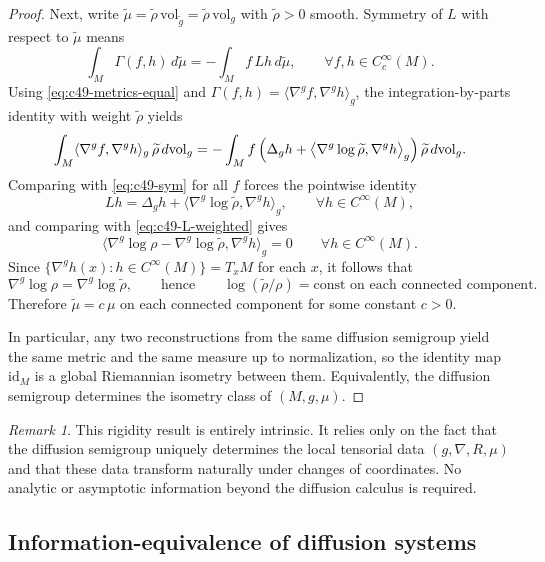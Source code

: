 \documentclass[11pt]{amsart}
\theoremstyle{definition}
\theoremstyle{remark}
\newtheorem{remark}[theorem]{Remark}
\begin{document}
\begin{proof}
Next, write $\widetilde\mu=\widetilde\rho\,\mathrm{vol}_{\widetilde g}
=\widetilde\rho\,\mathrm{vol}_g$ with $\widetilde\rho>0$ smooth. Symmetry of $L$ with respect to
$\widetilde\mu$ means
\begin{equation}\label{eq:c49-sym}
\int_M \Gamma(f,h)\,d\widetilde\mu
=-\int_M f\,Lh\,d\widetilde\mu,
\qquad \forall f,h\in C_c^\infty(M).
\end{equation}
Using \eqref{eq:c49-metrics-equal} and $\Gamma(f,h)=\langle \nabla^g f,\nabla^g h\rangle_g$,
the integration-by-parts identity with weight $\widetilde\rho$ yields
\[
\int_M \langle \nabla^g f,\nabla^g h\rangle_g\,\widetilde\rho\,d\mathrm{vol}_g
=-\int_M f\,\Bigl(\Delta_g h+\bigl\langle \nabla^g\log\widetilde\rho,\nabla^g h\bigr\rangle_g\Bigr)\,
\widetilde\rho\,d\mathrm{vol}_g.
\]
Comparing with \eqref{eq:c49-sym} for all $f$ forces the pointwise identity
\[
Lh=\Delta_g h+\bigl\langle \nabla^g\log\widetilde\rho,\nabla^g h\bigr\rangle_g,
\qquad \forall h\in C^\infty(M),
\]
and comparing with \eqref{eq:c49-L-weighted} gives
\[
\bigl\langle \nabla^g\log\rho-\nabla^g\log\widetilde\rho,\nabla^g h\bigr\rangle_g=0
\qquad \forall h\in C^\infty(M).
\]
Since $\{\nabla^g h(x):h\in C^\infty(M)\}=T_xM$ for each $x$, it follows that
\[
\nabla^g\log\rho=\nabla^g\log\widetilde\rho,
\qquad\text{hence}\qquad
\log(\widetilde\rho/\rho)=\text{const on each connected component}.
\]
Therefore $\widetilde\mu=c\,\mu$ on each connected component for some constant $c>0$.

In particular, any two reconstructions from the same diffusion semigroup yield the same metric
and the same measure up to normalization, so the identity map $\mathrm{id}_M$ is a global
Riemannian isometry between them. Equivalently, the diffusion semigroup determines the isometry
class of $(M,g,\mu)$.
\end{proof}


\begin{remark}
This rigidity result is entirely intrinsic.
It relies only on the fact that the diffusion semigroup uniquely determines the local
tensorial data $(g,\nabla,R,\mu)$ and that these data transform naturally under changes
of coordinates.
No analytic or asymptotic information beyond the diffusion calculus is required.
\end{remark}

\subsection{Information-equivalence of diffusion systems}
\label{subsec:information-equivalence}
\end{document}
